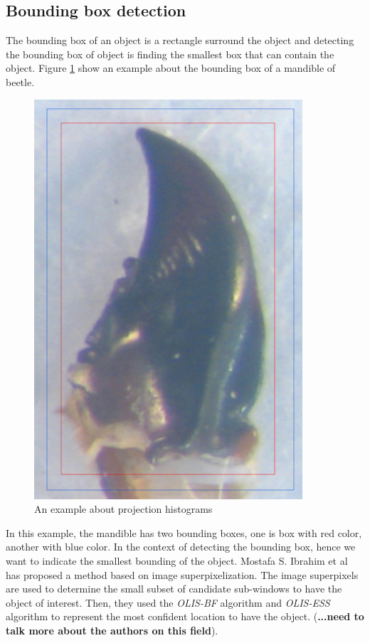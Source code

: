 \subsection{Bounding box detection}
The bounding box of an object is a rectangle surround the object and detecting the bounding box of object is finding the smallest box that can contain the object. Figure \ref{figbbox} show an example about the bounding box of a mandible of beetle.
\begin{figure}[h]
	\centering
	\includegraphics[scale=0.4]{images/bbox}
	\caption{An example about projection histograms}
	\label{figbbox}
\end{figure}
In this example, the mandible has two bounding boxes, one is box with red color, another with blue color. In the context of detecting the bounding box, hence we want to indicate the smallest bounding of the object. Mostafa S. Ibrahim et al \cite{ibrahim2012bounding} has proposed a method based on image superpixelization. The image superpixels are used to determine the small subset of candidate sub-windows to have the object of interest. Then, they used the \textit{OLIS-BF} algorithm and \textit{OLIS-ESS} algorithm to represent the most confident location to have the object. (\textbf{...need to talk more about the authors on this field}).\\[0.2cm]
